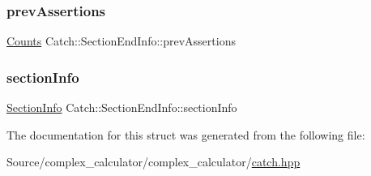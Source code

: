 \subsubsection{\texorpdfstring{prev\+Assertions}{prevAssertions}}
{\footnotesize\ttfamily \mbox{\hyperlink{struct_catch_1_1_counts}{Counts}} Catch\+::\+Section\+End\+Info\+::prev\+Assertions}

\mbox{\label{struct_catch_1_1_section_end_info_a2d44793392cb83735d086d726822abe9}} 
\subsubsection{\texorpdfstring{section\+Info}{sectionInfo}}
{\footnotesize\ttfamily \mbox{\hyperlink{struct_catch_1_1_section_info}{Section\+Info}} Catch\+::\+Section\+End\+Info\+::section\+Info}



The documentation for this struct was generated from the following file\+:\begin{DoxyCompactItemize}
\item 
Source/complex\+\_\+calculator/complex\+\_\+calculator/\mbox{\hyperlink{catch_8hpp}{catch.\+hpp}}\end{DoxyCompactItemize}
